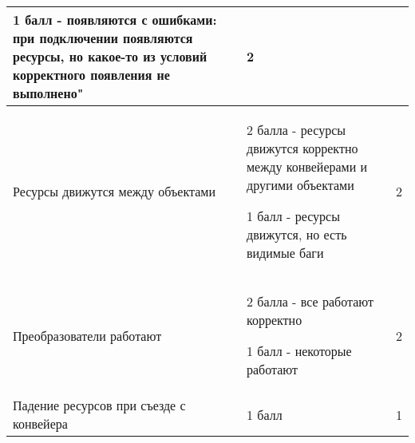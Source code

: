 \begin{tabular}{|p{4cm}|p{9cm}|p{1cm}|}
    1 балл - появляются с ошибками: при подключении появляются ресурсы, но какое-то из условий корректного появления не выполнено" & 2 \\
    \hline

    Ресурсы движутся между объектами & 2 балла - ресурсы движутся корректно между конвейерами и другими объектами

    1 балл - ресурсы движутся, но есть видимые баги & 2 \\
    \hline

    Преобразователи работают & 2 балла - все работают корректно
    
    1 балл - некоторые работают & 2 \\
    \hline


    Падение ресурсов при съезде с конвейера & 1 балл & 1 \\
    \hline

\end{tabular}

